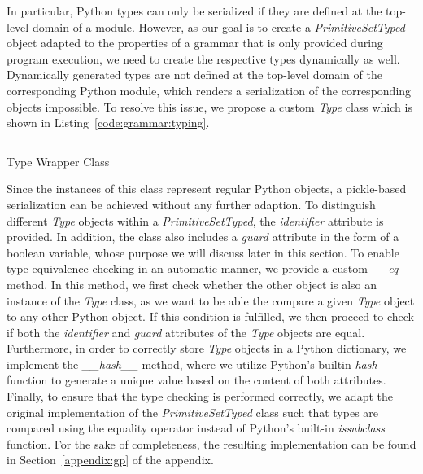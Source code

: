 In particular, Python types can only be serialized if they are defined at the top-level domain of a module.
However, as our goal is to create a \emph{PrimitiveSetTyped} object adapted to the properties of a grammar that is only provided during program execution, we need to create the respective types dynamically as well.
Dynamically generated types are not defined at the top-level domain of the corresponding Python module, which renders a serialization of the corresponding objects impossible.
To resolve this issue, we propose a custom \emph{Type} class which is shown in Listing~\ref{code:grammar:typing}.
\begin{listing}
	\inputminted{python}{evostencils/grammar/typing.py}
	\caption{Type Wrapper Class}
	\label{code:grammar:typing}
\end{listing}
Since the instances of this class represent regular Python objects, a pickle-based serialization can be achieved without any further adaption.
To distinguish different \emph{Type} objects within a \emph{PrimitiveSetTyped}, the \emph{identifier} attribute is provided.
In addition, the class also includes a \emph{guard} attribute in the form of a boolean variable, whose purpose we will discuss later in this section. 
To enable type equivalence checking in an automatic manner, we provide a custom \emph{\_\_eq\_\_} method.
In this method, we first check whether the other object is also an instance of the \emph{Type} class, as we want to be able the compare a given \emph{Type} object to any other Python object.
If this condition is fulfilled, we then proceed to check if both the \emph{identifier} and \emph{guard} attributes of the \emph{Type} objects are equal.
Furthermore, in order to correctly store \emph{Type} objects in a Python dictionary, we implement the \emph{\_\_hash\_\_} method, where we utilize Python's builtin \emph{hash} function to generate a unique value based on the content of both attributes. 
Finally, to ensure that the type checking is performed correctly, we adapt the original implementation of the \emph{PrimitiveSetTyped} class such that types are compared using the equality operator instead of Python's built-in \emph{issubclass} function.
For the sake of completeness, the resulting implementation can be found in Section~\ref{appendix:gp} of the appendix.

